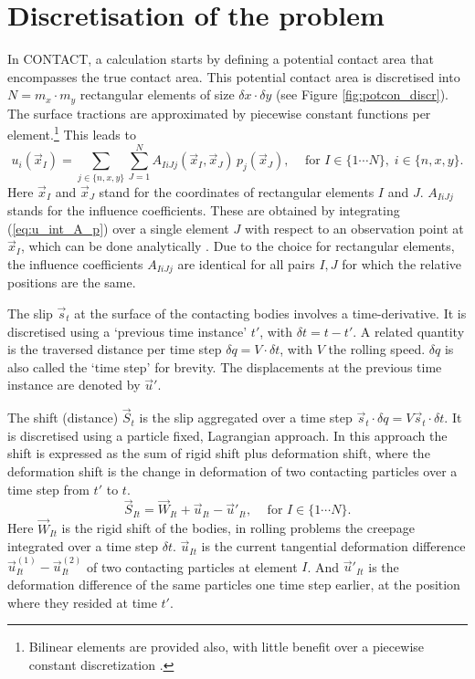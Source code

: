 \documentclass[12pt]{report}
\begin{document}
\section{Discretisation of the problem}

In CONTACT, a calculation starts by defining a potential contact area that
encompasses the true contact area. This potential contact area is
discretised into $N=m_x\cdot m_y$ rectangular elements of size $\delta x
\cdot \delta y$ (see Figure \ref{fig:potcon_discr}). The surface tractions
are approximated by piecewise constant functions per
element.\footnote{Bilinear elements are provided also, with little benefit
over a piecewise constant discretization \cite{Vollebregt2009a-cm2009,
Wekken2019a-subsurf}.} This leads to
\begin{equation}\label{eq:ui_sum_Aij_pj}
    u_i(\vec{x}_I) = \sum_{j\in\{n,x,y\}}\sum_{J=1}^N
        A_{IiJj}(\vec{x}_I,\vec{x}_J) \, p_j(\vec{x}_J), \;\;\;
        \mbox{ for } I\in\{1\cdots N\}, \; i\in \{n,x,y\}.
\end{equation}
Here $\vec{x}_I$ and $\vec{x}_J$ stand for the coordinates of rectangular
elements $I$ and $J$. $A_{IiJj}$ stands for the influence coefficients. These
are obtained by integrating (\ref{eq:u_int_A_p}) over a single element $J$
with respect to an observation point at $\vec{x}_I$, which can be done
analytically \cite{Kalker1990}. Due to the choice for rectangular elements,
the influence coefficients $A_{IiJj}$ are identical for all pairs $I,J$ for
which the relative positions are the same.

The slip $\vec{s}_t$ at the surface of the contacting bodies involves
a time-derivative. It is discretised using a `previous time instance'
$t'$, with $\delta t=t-t'$. A related quantity is the traversed distance
per time step $\delta q = V\cdot \delta t$, with $V$ the rolling speed.
$\delta q$ is also called the `time step' for brevity.
The displacements at the previous time instance are denoted by $\vec{u}'$.

The shift (distance) $\vec{S}_t$ is the slip aggregated over a time
step $\vec{s}_t\cdot\delta q=V\vec{s}_t\cdot\delta t$. It is discretised using
a particle fixed, Lagrangian approach. In this approach the shift is
expressed as the sum of rigid shift plus deformation shift, where the
deformation shift is the change in deformation of two contacting particles
over a time step from $t'$ to $t$.
\begin{equation}\label{eq:discr_shift}
   \vec{S}_{It} = \vec{W}_{It} + \vec{u}_{It} - \vec{u}'_{It}, \;\;\;
        \mbox{ for } I\in\{1\cdots N\}.
\end{equation}
Here $\vec{W}_{It}$ is the rigid shift of the bodies, in rolling problems the
creepage integrated over a time step $\delta t$. $\vec{u}_{It}$ is the current
tangential deformation difference $\vec{u}^{(1)}_{It}-\vec{u}^{(2)}_{It}$ of
two contacting particles at element $I$. And $\vec{u}'_{It}$ is the
deformation difference of the same particles one time step earlier, at
the position where they resided at time $t'$.
\end{document}
